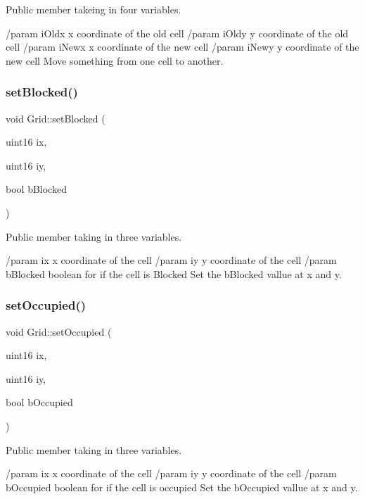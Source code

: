 Public member takeing in four variables. 

/param i\+Oldx x coordinate of the old cell /param i\+Oldy y coordinate of the old cell /param i\+Newx x coordinate of the new cell /param i\+Newy y coordinate of the new cell Move something from one cell to another. \hypertarget{class_grid_a19e1e00ddf325821bc0c16de9f7799ed}{}\label{class_grid_a19e1e00ddf325821bc0c16de9f7799ed} 
\subsubsection{\texorpdfstring{set\+Blocked()}{setBlocked()}}
{\footnotesize\ttfamily void Grid\+::set\+Blocked (\begin{DoxyParamCaption}\item[{uint16}]{ix,  }\item[{uint16}]{iy,  }\item[{bool}]{b\+Blocked }\end{DoxyParamCaption})}



Public member taking in three variables. 

/param ix x coordinate of the cell /param iy y coordinate of the cell /param b\+Blocked boolean for if the cell is Blocked Set the b\+Blocked vallue at x and y. \hypertarget{class_grid_a4142f2281cbb882c39514ffc3c2a59af}{}\label{class_grid_a4142f2281cbb882c39514ffc3c2a59af} 
\subsubsection{\texorpdfstring{set\+Occupied()}{setOccupied()}}
{\footnotesize\ttfamily void Grid\+::set\+Occupied (\begin{DoxyParamCaption}\item[{uint16}]{ix,  }\item[{uint16}]{iy,  }\item[{bool}]{b\+Occupied }\end{DoxyParamCaption})}



Public member taking in three variables. 

/param ix x coordinate of the cell /param iy y coordinate of the cell /param b\+Occupied boolean for if the cell is occupied Set the b\+Occupied vallue at x and y. \hypertarget{class_grid_a4704642a117a8be8e9defdda92784303}{}\label{class_grid_a4704642a117a8be8e9defdda92784303} 
